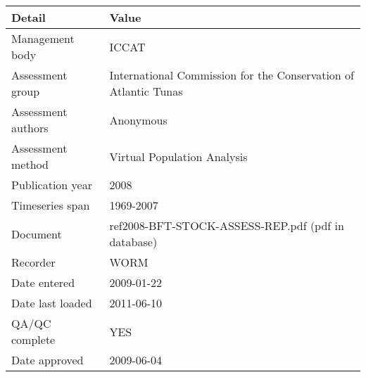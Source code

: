 \begin{table}[htb]
\centering
\begin{tabular}{lp{7cm}}
\toprule
Detail & Value \\
\midrule
Management body    & ICCAT                                                           \\
Assessment group   & International Commission for the Conservation of Atlantic Tunas \\
Assessment authors & Anonymous                                                       \\
Assessment method  & Virtual Population Analysis                                     \\
Publication year   & 2008                                                            \\
Timeseries span    & 1969-2007                                                       \\
Document           & ref2008-BFT-STOCK-ASSESS-REP.pdf (pdf in database)              \\
Recorder           & WORM                                                            \\
Date entered       & 2009-01-22                                                      \\
Date last loaded   & 2011-06-10                                                      \\
QA/QC complete     & YES                                                             \\
Date approved      & 2009-06-04                                                      \\
\bottomrule
\end{tabular}
\label{tab:assessdet}
\end{table}
